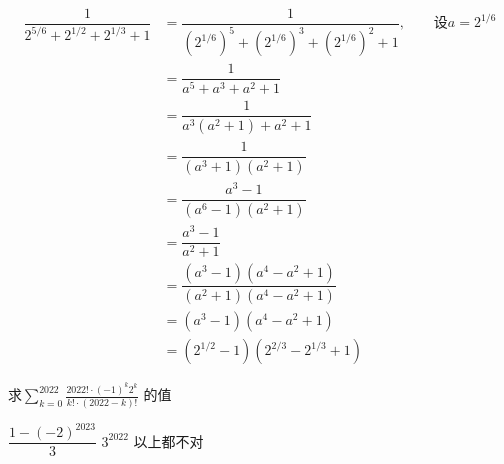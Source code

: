 \documentclass[answers]{exam}
\begin{document}
\begin{questions}
	\begin{solution}
		\begin{align*}
			\dfrac{1}{2^{5/6} + 2^{1/2} + 2^{1/3} + 1} & = \dfrac{1}{(2^{1/6})^5 + (2^{1/6})^3 + (2^{1/6})^2 + 1},
			\qquad \text{设} a = 2^{1/6}                                                                              \\
			                                           & = \dfrac{1}{a^5 + a^3 + a^2 + 1}                             \\
			                                           & = \dfrac{1}{a^3(a^2 + 1) + a^2 + 1}                          \\
			                                           & = \dfrac{1}{(a^3 + 1)(a^2 + 1)}                              \\
			                                           & = \dfrac{a^3 - 1}{(a^6 - 1)(a^2 + 1)}                        \\
			                                           & = \dfrac{a^3 - 1}{a^2 + 1}                                   \\
			                                           & = \dfrac{(a^3 - 1)(a^4 - a^2 + 1)}{(a^2 + 1)(a^4 - a^2 + 1)} \\
			                                           & = (a^3 - 1)(a^4 - a^2 + 1)                                   \\
			                                           & = (2^{1/2} - 1)(2^{2/3} - 2^{1/3} + 1)
		\end{align*}
	\end{solution}

	\question 求\(  \displaystyle\sum_{k=0}^{2022}\frac{2022!\cdot (-1)^k2^k}{k! \cdot (2022-k)!}\) 的值

	\begin{oneparchoices}
		\choice \( \dfrac{1-(-2)^{2023}}{3} \)
		\choice \( 3^{2022} \)
		\choice 以上都不对
	\end{oneparchoices}


\end{questions}
\end{document}

